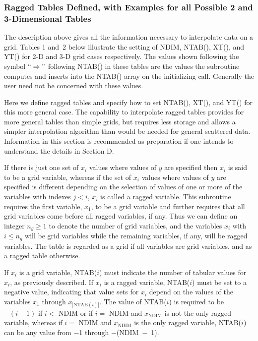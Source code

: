 \documentclass[twoside]{MATH77}
\begin{document}
\subsubsection{Ragged Tables Defined, with Examples for all Possible 2 and
3-Dimensional Tables}

The description above gives all the information necessary to interpolate
data on a grid. Tables 1 and~2 below illustrate the setting of NDIM, NTAB(),
XT(), and YT() for 2-D and 3-D grid cases respectively. The values shown
following the symbol $``\Rightarrow "$ following NTAB() in these tables are
the values the subroutine computes and inserts into the NTAB() array on the
initializing call. Generally the user need not be concerned with these
values.

Here we define ragged tables and specify how to set NTAB(), XT(), and YT()
for this more general case. The capability to interpolate ragged tables
provides for more general tables than simple grids, but requires less
storage and allows a simpler interpolation algorithm than would be needed
for general scattered data. Information in this section is recommended as
preparation if one intends to understand the details in Section D.

If there is just one set of $x_i$ values where values of $y$ are specified
then $x_i$ is said to be a grid variable, whereas if the set of $x_i$ values
where values of $y$ are specified is different depending on the selection of
values of one or more of the variables with indexes $j < i$, $x_i$ is called
a ragged variable. This subroutine requires the first variable, $x_1$, to be
a grid variable and further requires that all grid variables come before all
ragged variables, if any. Thus we can define an integer $n_g \geq 1$ to
denote the number of grid variables, and the variables $x_i$ with $i \leq
n_g $ will be grid variables while the remaining variables, if any, will be
ragged variables. The table is regarded as a grid if all variables are grid
variables, and as a ragged table otherwise.

If $x_i$ is a grid variable, NTAB($i$) must indicate the number of tabular
values for $x_i$, as previously described. If $x_i$ is a ragged variable,
NTAB($i$) must be set to a negative value, indicating that value sets for $x_i$
depend on the values of the variables $x_1$ through $x_{|\text{NTAB}(i)|}$.
The value of NTAB($i$) is required to be $-(i-1)$ if $i < $ NDIM or if $i =$
NDIM and $x_{\text{NDIM}}$ is not the only ragged variable, whereas if $i =$
NDIM and $x_{\text{NDIM}}$ is the only ragged variable, NTAB($i$) can be any
value from $-$1 through $-$(NDIM~$-$~1).
\end{document}
